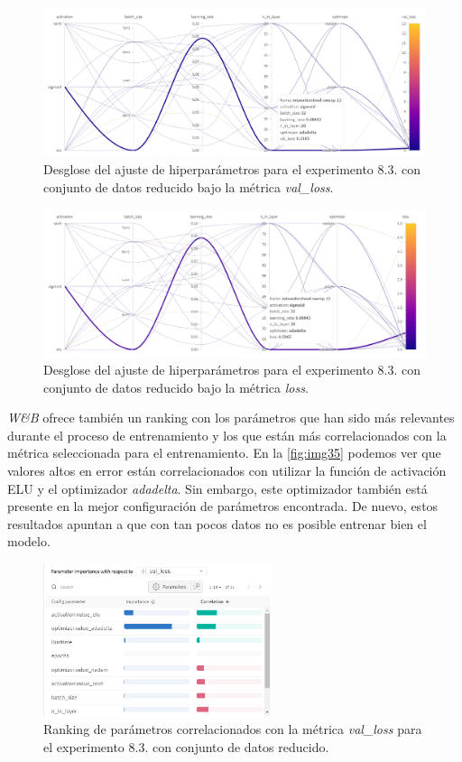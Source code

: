 \begin{figure}[htbp]
    \centering
    \includegraphics[width=1\textwidth]{img/img36.png}
    \caption{Desglose del ajuste de hiperparámetros para el experimento 8.3. con conjunto de datos reducido bajo la métrica \textit{val\_loss}. }
    \label{fig:img36}
\end{figure}

\begin{figure}[htbp]
    \centering
    \includegraphics[width=1\textwidth]{img/img37.png}
    \caption{Desglose del ajuste de hiperparámetros para el experimento 8.3. con conjunto de datos reducido bajo la métrica \textit{loss}.}
    \label{fig:img37}
\end{figure}

\textit{W\&B} ofrece también un ranking con los parámetros que han sido más relevantes durante el proceso de entrenamiento y los que están más correlacionados con la métrica seleccionada para el entrenamiento. En la \autoref{fig:img35} podemos ver que valores altos en error están correlacionados con utilizar la función de activación ELU y el optimizador \textit{adadelta}. Sin embargo, este optimizador también está presente en la mejor configuración de parámetros encontrada. De nuevo, estos resultados apuntan a que con tan pocos datos no es posible entrenar bien el modelo. 


\begin{figure}[htbp]
    \centering
    \includegraphics[width=0.6\textwidth]{img/img35.png}
    \caption{Ranking de parámetros correlacionados con la métrica \textit{val\_loss} para el experimento 8.3. con conjunto de datos reducido.}
    \label{fig:img35}
\end{figure}


